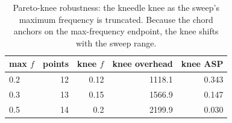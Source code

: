 \begin{table}[t]
\centering
\caption{Pareto-knee robustness: the kneedle knee as the sweep's maximum frequency is truncated. Because the chord anchors on the max-frequency endpoint, the knee shifts with the sweep range.}
\label{tab:knee_robustness}
\begin{tabular}{lrrrr}
\toprule
max $f$ & points & knee $f$ & knee overhead & knee ASP \\
\midrule
0.2 & 12 & 0.12 & 1118.1 & 0.343 \\
0.3 & 13 & 0.15 & 1566.9 & 0.147 \\
0.5 & 14 & 0.2 & 2199.9 & 0.030 \\
\bottomrule
\end{tabular}
\end{table}

